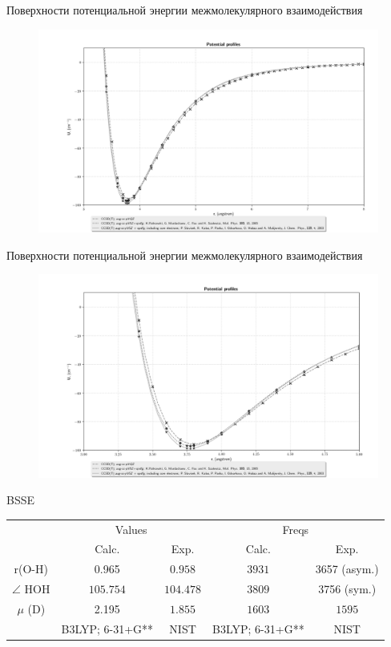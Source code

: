 \documentclass[hyperref={pdfpagelabel=false},usepdftitle=false,xcolor=dvipsnames]{beamer}
\begin{document}
\begin{frame}{\normalsize Поверхности потенциальной энергии межмолекулярного взаимодействия }
\begin{figure}
\vspace*{-0.3cm}
\includegraphics[width = \linewidth]{pictures/pp38.png}
\end{figure}
\end{frame}

\begin{frame}{\normalsize Поверхности потенциальной энергии межмолекулярного взаимодействия }
\begin{figure}
\vspace*{-0.3cm}
\includegraphics[width = \linewidth]{pictures/pp35.png}
\end{figure}
\end{frame}

\begin{frame}{\normalsize BSSE}
\begin{tabular}{ccccc}
\toprule
& \multicolumn{2}{c}{Values} & \multicolumn{2}{c}{Freqs} \\
\cmidrule(r){2-3} \cmidrule(r){4-5}  
& Calc. & Exp. & Calc. & Exp. \\
\cmidrule(r){2-3} \cmidrule(r){4-5}
r(O-H) & 0.965 & $0.958$ & $3931$ & 3657 (asym.) \\
$\angle$ HOH & $105.754$ & $104.478$ & $3809$ & 3756 (sym.) \\
$\mu$ (D) & 2.195 & $1.855$ & $1603$ & $1595$ \\
	       & B3LYP; 6-31+G** & NIST & B3LYP; 6-31+G** & NIST \\
\bottomrule
\end{tabular}
\end{frame}
\end{document}
